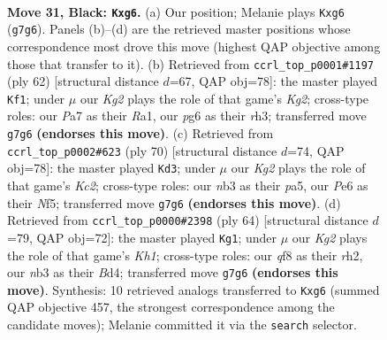 \documentclass[11pt]{article}
\begin{document}
\clearpage

\begin{figure}[p]\centering
\begin{subfigure}{0.46\textwidth}\centering
\resizebox{\linewidth}{!}{%
\newchessgame
\chessboard[
  setfen={5Q2/p3r1k1/p3p1P1/8/7q/1N6/1P3RB1/2B3K1 b - - 2 31},
  showmover=false,
  pgfstyle=straightmove, color=movearrow, markmove={g7-g6}
]}
\caption{}
\end{subfigure}\hfill
\begin{subfigure}{0.46\textwidth}\centering
\resizebox{\linewidth}{!}{%
\newchessgame
\chessboard[
  setfen={8/pQ4pk/8/5p2/2P5/6qr/PP2R1K1/R7 w - - 2 32},
  showmover=false,
  pgfstyle=straightmove, color=movearrow, markmove={g2-f1}
]}
\caption{}
\end{subfigure}
\\[4pt]
\begin{subfigure}{0.46\textwidth}\centering
\resizebox{\linewidth}{!}{%
\newchessgame
\chessboard[
  setfen={r7/2Q3bk/7p/p4N2/8/8/1qKR1PPP/8 w - - 0 36},
  showmover=false,
  pgfstyle=straightmove, color=movearrow, markmove={c2-d3}
]}
\caption{}
\end{subfigure}\hfill
\begin{subfigure}{0.46\textwidth}\centering
\resizebox{\linewidth}{!}{%
\newchessgame
\chessboard[
  setfen={1b4k1/5pp1/1PQ3n1/7p/3B1P2/8/r6r/5R1K w - - 0 33},
  showmover=false,
  pgfstyle=straightmove, color=movearrow, markmove={h1-g1}
]}
\caption{}
\end{subfigure}
\caption{\textbf{Move 31, Black: \texttt{Kxg6}.} (a) Our position; Melanie plays \texttt{Kxg6} (\texttt{g7g6}). Panels (b)--(d) are the retrieved master positions whose correspondence most drove this move (highest QAP objective among those that transfer to it). (b) Retrieved from \texttt{ccrl\_top\_p0001\#1197} (ply 62) [structural distance $d$=67, QAP obj=78]: the master played \texttt{Kf1}; under $\mu$ our \emph{Kg2} plays the role of that game's \emph{Kg2}; cross-type roles: our \emph{P}a7 as their \emph{R}a1, our \emph{p}g6 as their \emph{r}h3; transferred move \texttt{g7g6} \textbf{(endorses this move)}. (c) Retrieved from \texttt{ccrl\_top\_p0002\#623} (ply 70) [structural distance $d$=74, QAP obj=78]: the master played \texttt{Kd3}; under $\mu$ our \emph{Kg2} plays the role of that game's \emph{Kc2}; cross-type roles: our \emph{n}b3 as their \emph{p}a5, our \emph{P}e6 as their \emph{N}f5; transferred move \texttt{g7g6} \textbf{(endorses this move)}. (d) Retrieved from \texttt{ccrl\_top\_p0000\#2398} (ply 64) [structural distance $d$=79, QAP obj=72]: the master played \texttt{Kg1}; under $\mu$ our \emph{Kg2} plays the role of that game's \emph{Kh1}; cross-type roles: our \emph{q}f8 as their \emph{r}h2, our \emph{n}b3 as their \emph{B}d4; transferred move \texttt{g7g6} \textbf{(endorses this move)}. Synthesis: 10 retrieved analogs transferred to \texttt{Kxg6} (summed QAP objective 457, the strongest correspondence among the candidate moves); Melanie committed it via the \texttt{search} selector.}
\label{fig:thought-m61}
\end{figure}
\end{document}
